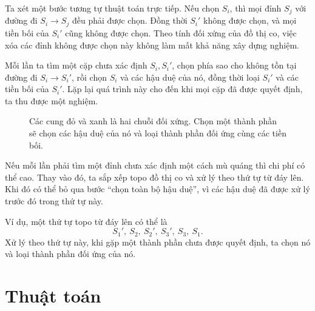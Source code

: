 \documentclass[11pt]{article}
\begin{document}
Ta xét một bước tương tự thuật toán trực tiếp. Nếu chọn $S_i$, thì mọi
đỉnh $S_j$ với đường đi $S_i \to S_j$ đều phải được chọn. Đồng thời
$S_i'$ không được chọn, và mọi tiền bối của $S_i'$ cũng không được
chọn. Theo tính đối xứng của đồ thị co, việc xóa các đỉnh không được
chọn này không làm mất khả năng xây dựng nghiệm.

Mỗi lần ta tìm một cặp chưa xác định $S_i, S_i'$, chọn phía sao cho
không tồn tại đường đi $S_i \to S_i'$, rồi chọn $S_i$ và các hậu duệ
của nó, đồng thời loại $S_i'$ và các tiền bối của $S_i'$. Lặp lại quá
trình này cho đến khi mọi cặp đã được quyết định, ta thu được một
nghiệm.

\begin{figure}[ht]
\centering
{}
\caption{Các cung đỏ và xanh là hai chuỗi đối xứng. Chọn một thành phần sẽ chọn các hậu duệ của nó và loại thành phần đối ứng cùng các tiền bối.}
\end{figure}

Nếu mỗi lần phải tìm một đỉnh chưa xác định một cách mù quáng thì chi
phí có thể cao. Thay vào đó, ta sắp xếp topo đồ thị co và xử lý theo
thứ tự từ đáy lên. Khi đó có thể bỏ qua bước ``chọn toàn bộ hậu duệ'',
vì các hậu duệ đã được xử lý trước đó trong thứ tự này.

Ví dụ, một thứ tự topo từ đáy lên có thể là
\[
  S_1',\ S_2,\ S_2',\ S_3',\ S_3,\ S_1 .
\]
Xử lý theo thứ tự này, khi gặp một thành phần chưa được quyết định, ta
chọn nó và loại thành phần đối ứng của nó.

\section{Thuật toán}
\end{document}
